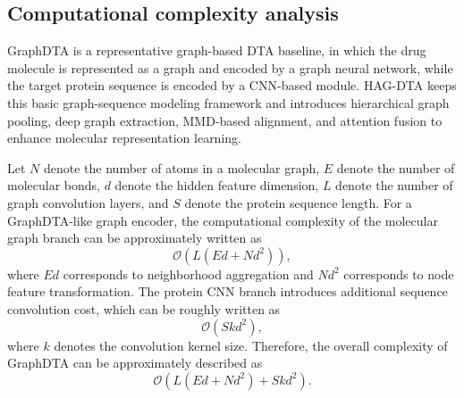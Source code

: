 \documentclass[pdflatex,sn-mathphys-num]{sn-jnl}%
\theoremstyle{thmstyleone}%
\theoremstyle{thmstyletwo}%
\theoremstyle{thmstylethree}%
\begin{document}
\subsection{Computational complexity analysis}

GraphDTA is a representative graph-based DTA baseline, in which the drug molecule is represented as a graph and encoded by a graph neural network, while the target protein sequence is encoded by a CNN-based module. HAG-DTA keeps this basic graph-sequence modeling framework and introduces hierarchical graph pooling, deep graph extraction, MMD-based alignment, and attention fusion to enhance molecular representation learning.

Let $N$ denote the number of atoms in a molecular graph, $E$ denote the number of molecular bonds, $d$ denote the hidden feature dimension, $L$ denote the number of graph convolution layers, and $S$ denote the protein sequence length. For a GraphDTA-like graph encoder, the computational complexity of the molecular graph branch can be approximately written as
\begin{equation}
\mathcal{O}\left(L(E d + N d^2)\right),
\end{equation}
where $Ed$ corresponds to neighborhood aggregation and $Nd^2$ corresponds to node feature transformation. The protein CNN branch introduces additional sequence convolution cost, which can be roughly written as
\begin{equation}
\mathcal{O}\left(S k d^2\right),
\end{equation}
where $k$ denotes the convolution kernel size. Therefore, the overall complexity of GraphDTA can be approximately described as
\begin{equation}
\mathcal{O}\left(L(E d + N d^2) + S k d^2\right).
\end{equation}
\end{document}
